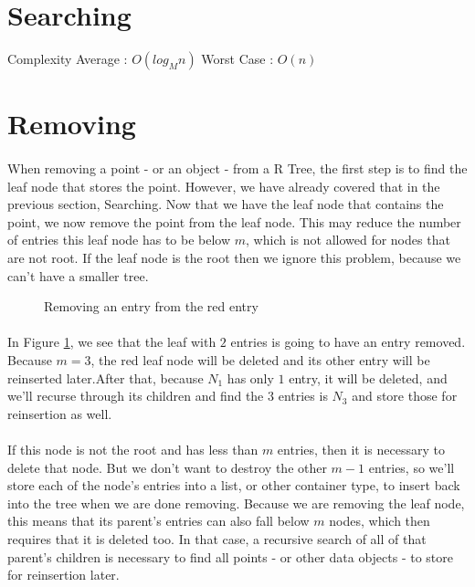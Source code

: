 \documentclass{article}
\begin{document}
\section{Searching}
Complexity
Average : $O(log_Mn)$
Worst Case : $O(n)$

\section{Removing}
\paragraph{}
When removing a point - or an object - from a R Tree, the first step is to find the leaf node that stores the point.
However, we have already covered that in the previous section, Searching. Now that we have the leaf node that contains
the point, we now remove the point from the leaf node. This may reduce the number of entries this leaf node has to be below
$m$, which is not allowed for nodes that are not root. If the leaf node is the root then we ignore this problem, because
we can't have a smaller tree.\\
\begin{figure}[h]
\caption{Removing an entry from the red entry}
\centering
\label{fig:removing}
\end{figure}
\paragraph{}
In Figure \ref{fig:removing}, we see that the leaf with $2$ entries is going to have an entry removed. Because $m=3$, the red leaf node will be deleted and its other entry will be reinserted later.After that, because $N_1$ has only $1$ entry, it will be deleted, and we'll recurse through its children and find the $3$ entries is $N_3$ and store those for reinsertion as well.
\paragraph{}
If this node is not the root and has less than $m$ entries, then it is necessary to delete that node. But we don't want to destroy
the other $m - 1$ entries, so we'll store each of the node's entries into a list, or other container type, to insert back into
the tree when we are done removing. Because we are removing the leaf node, this means that its parent's entries can also fall below
$m$ nodes, which then requires that it is deleted too. In that case, a recursive search of all of that parent's children is necessary
to find all points - or other data objects - to store for reinsertion later.
\end{document}
